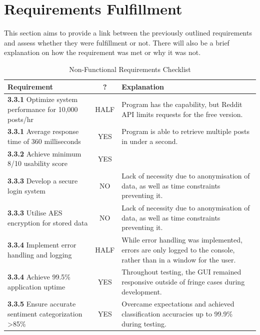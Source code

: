 \section{Requirements Fulfillment}
This section aims to provide a link between the previously outlined requirements and assess whether they were fulfillment or not. There will also be a brief explanation on how the requirement was met or why it was not.

\begin{table}[h]
    \centering
    \caption{Non-Functional Requirements Checklist}
    \label{tab:non_functional_requirements}
    \begin{tabular}{p{6cm}|c|p{6cm}}
        \textbf{Requirement} & \textbf{?} & \textbf{Explanation} \\ \hline\hline
        \textbf{3.3.1} Optimize system performance for 10,000 posts/hr & HALF & Program has the capability, but Reddit API limits requests for the free version. \\ \hline
        \textbf{3.3.1} Average response time of 360 milliseconds & YES & Program is able to retrieve multiple posts in under a second. \\ \hline
        \textbf{3.3.2} Achieve minimum 8/10 usability score & YES &  \\ \hline
        \textbf{3.3.3} Develop a secure login system & NO & Lack of necessity due to anonymisation of data, as well as time constraints preventing it. \\ \hline
        \textbf{3.3.3} Utilise AES encryption for stored data & NO & Lack of necessity due to anonymisation of data, as well as time constraints preventing it. \\ \hline
        \textbf{3.3.4} Implement error handling and logging & HALF & While error handling was implemented, errors are only logged to the console, rather than in a window for the user. \\ \hline
        \textbf{3.3.4} Achieve 99.5\% application uptime & YES & Throughout testing, the GUI remained responsive outside of fringe cases during development. \\ \hline
        \textbf{3.3.5} Ensure accurate sentiment categorization >85\% & YES & Overcame expectations and achieved classification accuracies up to 99.9\% during testing. \\ 
    \end{tabular}
\end{table}

